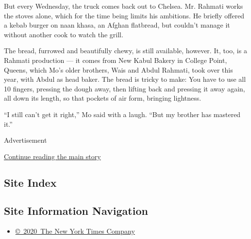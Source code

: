 But every Wednesday, the truck comes back out to Chelsea. Mr. Rahmati
works the stoves alone, which for the time being limits his ambitions.
He briefly offered a kebab burger on naan khasa, an Afghan flatbread,
but couldn't manage it without another cook to watch the grill.

The bread, furrowed and beautifully chewy, is still available, however.
It, too, is a Rahmati production --- it comes from New Kabul Bakery in
College Point, Queens, which Mo's older brothers, Wais and Abdul
Rahmati, took over this year, with Abdul as head baker. The bread is
tricky to make: You have to use all 10 fingers, pressing the dough away,
then lifting back and pressing it away again, all down its length, so
that pockets of air form, bringing lightness.

``I still can't get it right,'' Mo said with a laugh. ``But my brother
has mastered it.''

Advertisement

\protect\hyperlink{after-bottom}{Continue reading the main story}

\hypertarget{site-index}{%
\subsection{Site Index}\label{site-index}}

\hypertarget{site-information-navigation}{%
\subsection{Site Information
Navigation}\label{site-information-navigation}}

\begin{itemize}
\tightlist
\item
  \href{https://help.nytimes3xbfgragh.onion/hc/en-us/articles/115014792127-Copyright-notice}{©~2020~The
  New York Times Company}
\end{itemize}

